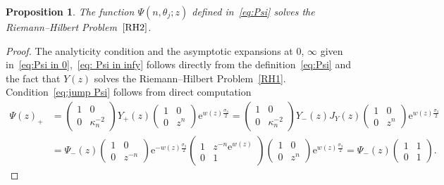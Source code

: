 \documentclass[pdftex]{sigma}%
\numberwithin{equation}{section}
\newtheorem{Proposition}[Theorem]{Proposition}
 { \theoremstyle{definition}
\newtheorem{Definition}[Theorem]{Definition}
\newtheorem{Note}[Theorem]{Note}
\newtheorem{Example}[Theorem]{Example}
\newtheorem{problem}[Theorem]{Riemann--Hilbert Problem}
\newtheorem{Remark}[Theorem]{Remark} }
\def\e{\mathrm{e}}
\begin{document}
\begin{Proposition}
The function $\Psi(n,\theta_j;z)$ defined in~\eqref{eq:Psi} solves the Riemann--Hilbert Problem~$\ref{RH2}$.
\end{Proposition}

\begin{proof}
		The analyticity condition and the asymptotic expansions at $0$, $\infty$ given in~\eqref{eq:Psi in 0},~\eqref{eq: Psi in infy} follows directly from the definition~\eqref{eq:Psi} and the fact that $Y(z)$ solves the Riemann--Hilbert Problem~\ref{RH1}. Condition~\eqref{eq:jump Psi} follows from direct computation
\begin{align*}
			\Psi(z)_+&=\begin{pmatrix}
				1&0\\
				0& \kappa_{n}^{-2}
			\end{pmatrix}Y_+(z)\begin{pmatrix}
				1&0\\
				0&z^n
			\end{pmatrix}\e^{w(z)\frac{\sigma_3}{2}}=\begin{pmatrix}
				1&0\\
				0& \kappa_{n}^{-2}
			\end{pmatrix}Y_-(z)J_Y(z)\begin{pmatrix}
				1&0\\
				0&z^n
			\end{pmatrix}\e^{w(z)\frac{\sigma_3}{2}}
			\\[2mm]
			&=\Psi_-(z) \begin{pmatrix}
				1&0\\
				0&z^{-n}
			\end{pmatrix}\e^{-w(z)\frac{\sigma_3}{2}}\begin{pmatrix}
				1 &z^{-n}\e^{w(z)}\\
				0&1
			\end{pmatrix}\begin{pmatrix}
				1&0\\
				0&z^n
			\end{pmatrix}\e^{w(z)\frac{\sigma_3}{2}}
=\Psi_-(z)\begin{pmatrix}
				1&1\\
				0&1
			\end{pmatrix}\!.\!\!\!\! \tag*{\qed}
\end{align*}
\renewcommand{\qed}{}
\end{proof}
\end{document}
